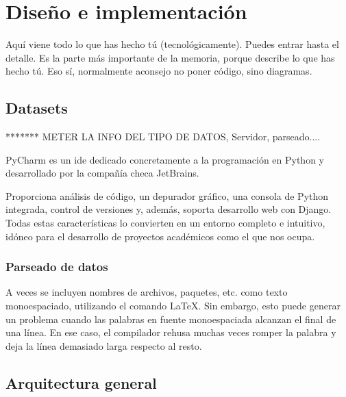 \documentclass[a4paper, 12pt]{book}
\begin{document}
\cleardoublepage


\chapter{Diseño e implementación}
\label{chap:diseño}


Aquí viene todo lo que has hecho tú (tecnológicamente). 
Puedes entrar hasta el detalle. 
Es la parte más importante de la memoria, porque describe lo que has hecho tú.
Eso sí, normalmente aconsejo no poner código, sino diagramas.

\section{Datasets}
\label{sec:datasets}

******* METER LA INFO DEL TIPO DE DATOS, Servidor, parseado.... 

PyCharm es un \gls{ide} dedicado concretamente a la programación en Python y desarrollado por la compañía checa JetBrains.

Proporciona análisis de código, un depurador gráfico, una consola de Python integrada, control de versiones y, además, soporta desarrollo web con Django. Todas estas características lo convierten en un entorno completo e intuitivo, idóneo para el desarrollo de proyectos académicos como el que nos ocupa.

\subsection{Parseado de datos}
\label{sec:parser} 
A veces se incluyen nombres de archivos, paquetes, etc. como texto monoespaciado, utilizando
el comando \LaTeX \texttt{\texttt{}}. Sin embargo, esto puede generar un problema
cuando las palabras en fuente monoespaciada alcanzan el final de una línea. En ese caso,
el compilador rehusa muchas veces romper la palabra y deja la línea demasiado larga respecto
al resto.

\section{Arquitectura general} 
\label{sec:arquitectura}
\end{document}
